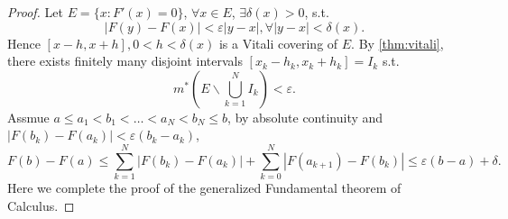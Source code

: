 \begin{proof}[Proof]
	Let $E = \{x: F'(x) = 0\}$, $\forall x\in E$, $\exists \delta(x)>0$, s.t.
	\[
	|F(y) - F(x)| < \varepsilon |y - x|, \forall |y-x| < \delta(x).
	\]
	Hence $[x-h, x+h], 0<h<\delta(x)$ is a Vitali covering of $E$.
	By \autoref{thm:vitali},
	there exists finitely many disjoint intervals $[x_k-h_k,x_k+h_k]=I_k$ s.t.
	\[
	m^*\left(E\backslash\bigcup_{k=1}^N I_k\right) < \varepsilon.
	\]
	Assmue $a\le a_1<b_1<\dots<a_N<b_N\le b$, by absolute continuity
	and $|F(b_k) - F(a_k)| < \varepsilon(b_k - a_k)$,
	\[
	F(b) - F(a) \le \sum_{k=1}^{N} |F(b_k)-F(a_k)| + \sum_{k=0}^{N}|F(a_{k+1})-F(b_k)|
	\le \varepsilon(b-a) + \delta.
	\]
	Here we complete the proof of the generalized Fundamental theorem of Calculus.
\end{proof}
